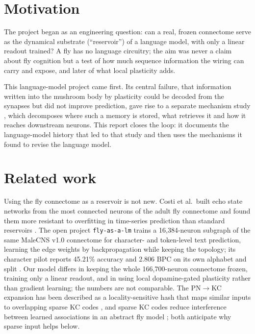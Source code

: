 \documentclass[conference]{IEEEtran}
\begin{document}
\section{Motivation}
The project began as an engineering question: can a real, frozen connectome
serve as the dynamical substrate (``reservoir'') of a language model, with only
a linear readout trained? A fly has no language circuitry; the aim was never a
claim about fly cognition but a test of how much sequence information the
wiring can carry and expose, and later of what local plasticity adds.

This language-model project came first. Its central failure, that
information written into the mushroom body by plasticity could be decoded
from the synapses but did not improve prediction, gave rise to a separate
mechanism study \cite{mechpaper}, which decomposes where such a memory is
stored, what retrieves it and how it reaches downstream neurons. This report
closes the loop: it documents the language-model history that led to that
study and then uses the mechanisms it found to revise the language model.

\section{Related work}
Using the fly connectome as a reservoir is not new. Costi et al.\ built echo
state networks from the most connected neurons of the adult fly connectome
and found them more resistant to overfitting in time-series prediction than
standard reservoirs \cite{costi2025}. The open project \texttt{fly-as-a-lm}
trains a 16{,}384-neuron subgraph of the same MaleCNS v1.0 connectome for
character- and token-level text prediction, learning the edge weights by
backpropagation while keeping the topology; its character pilot reports
45.21\% accuracy and 2.806 BPC on its own alphabet and split
\cite{flyasalm}. Our model differs in keeping the whole 166{,}700-neuron
connectome frozen, training only a linear readout, and in using local
dopamine-gated plasticity rather than gradient learning; the numbers are not
comparable. The PN$\rightarrow$KC expansion has been described as a
locality-sensitive hash that maps similar inputs to overlapping sparse KC
codes \cite{dasgupta2017}, and sparse KC codes reduce interference between
learned associations in an abstract fly model \cite{shen2023}; both anticipate
why sparse input helps below.
\end{document}
